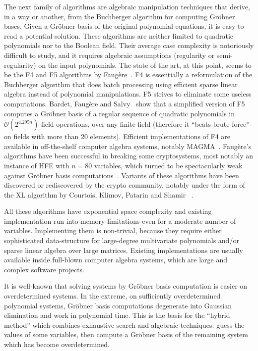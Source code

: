 \documentclass[twoside,leqno]{article}
\newcommand{\bigOsoft}[1]{\ensuremath{\mathcal{\tilde O}\left( #1 \right)} }
\begin{document}
The next family of algorithms are algebraic manipulation techniques that derive,
in a way or another, from the Buchberger algorithm for computing Gröbner
bases. Given a Gröbner basis of the original polynomial equations, it is easy
to read a potential solution. These algorithms are neither limited to quadratic
polynomials nor to the Boolean field. Their average case complexity is
notoriously difficult to study, and it requires algebraic assumptions
(regularity or semi-regularity) on the input polynomials. The state of the art,
at this point, seems to be the \textsf{F4} and \textsf{F5} algorithms by
Faugère~\cite{F4,F5}. \textsf{F4} is essentially a reformulation of the
Buchberger algorithm that does batch processing using efficient sparse linear
algebra instead of polynomial manipulations. \textsf{F5} strives to eliminate
some useless computations. Bardet, Faugère and Salvy~\cite{BardetFS15} show that
a simplified version of \textsf{F5} computes a Gröbner basis of a regular
sequence of quadratic polynomials in $\bigOsoft{2^{4.295n}}$ field operations,
over any finite field (therefore it ``beats brute force'' on fields with more
than 20 elements). Efficient implementations of \textsf{F4} are available in
off-the-shelf computer algebra systems, notably
\textsf{MAGMA}~\cite{MAGMA}. Faugère's algorithms have been successful in
breaking some cryptosystems, most notably an instance of \textsf{HFE} with
$n=80$ variables, which turned to be spectacularly weak against Gröbner basis
computations~\cite{FaugereJ03}. Variants of these algorithms have been
discovered or rediscovered by the crypto community, notably under the form of
the \textsf{XL} algorithm by Courtois, Klimov, Patarin and Shamir
~\cite{CourtoisKPS00}.

All these algorithms have exponential space complexity and existing
implementation run into memory limitations even for a moderate number of
variables. Implementing them is non-trivial, because they require either
sophisticated data-structure for large-degree multivariate polynomials and/or
sparse linear algebra over large matrices. Existing implementations are usually
available inside full-blown computer algebra systems, which are large and
complex software projects.

It is well-known that solving systems by Gröbner basis computation is easier on
overdetermined systems. In the extreme, on sufficiently overdetermined
polynomial systems, Gröbner basis computations degenerate into Gaussian
elimination and work in polynomial time. This is the basis for the ``hybrid
method'' which combines exhaustive search and algebraic techniques: guess the
values of some variables, then compute a Gröbner basis of the remaining system
which has become overdetermined.
\end{document}
